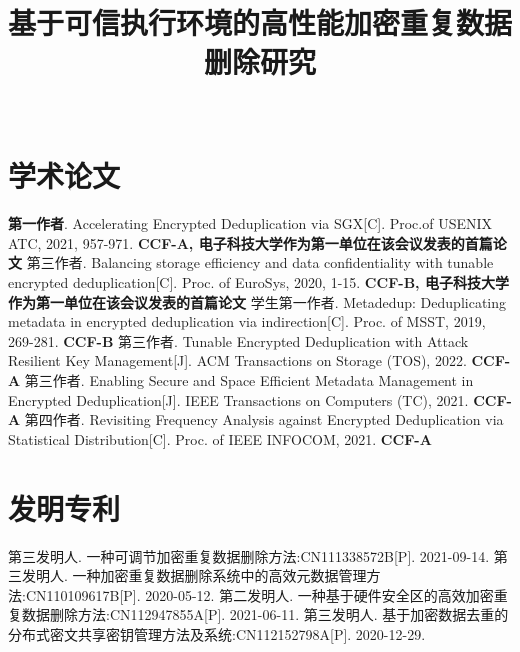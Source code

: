 \documentclass[master]{thesis-uestc}
\title{基于可信执行环境的高性能加密重复数据删除研究}{High-Performance Encrypted Data Deduplication System Based on Trusted Execution Environment}
\author{$\quad$}{$\quad$}
\begin{document}
\makecover
\originalitydeclaration



\thesistableofcontents
\thesisglossarylist







\thesisacknowledgement
% 


\thesisappendix


\begin{thesistheaccomplish}
    \section{学术论文}
     \textbf{第一作者}. Accelerating Encrypted Deduplication via SGX[C]. Proc.of USENIX ATC, 2021, 957-971. \textbf{CCF-A, 电子科技大学作为第一单位在该会议发表的首篇论文}
     第三作者. Balancing storage efficiency and data confidentiality with tunable encrypted deduplication[C]. Proc. of EuroSys, 2020, 1-15. \textbf{CCF-B, 电子科技大学作为第一单位在该会议发表的首篇论文}
     学生第一作者. Metadedup: Deduplicating metadata in encrypted deduplication via indirection[C]. Proc. of MSST, 2019, 269-281. \textbf{CCF-B}
     第三作者. Tunable Encrypted Deduplication with Attack Resilient Key Management[J]. ACM Transactions on Storage (TOS), 2022. \textbf{CCF-A}
     第三作者. Enabling Secure and Space Efficient Metadata Management in Encrypted Deduplication[J]. IEEE Transactions on Computers (TC), 2021. \textbf{CCF-A}
     第四作者. Revisiting Frequency Analysis against Encrypted Deduplication via Statistical Distribution[C]. Proc. of IEEE INFOCOM, 2021. \textbf{CCF-A}
    \section{发明专利}
     第三发明人. 一种可调节加密重复数据删除方法:CN111338572B[P]. 2021-09-14.
     第三发明人. 一种加密重复数据删除系统中的高效元数据管理方法:CN110109617B[P]. 2020-05-12.
     第二发明人. 一种基于硬件安全区的高效加密重复数据删除方法:CN112947855A[P]. 2021-06-11.
     第三发明人. 基于加密数据去重的分布式密文共享密钥管理方法及系统:CN112152798A[P]. 2020-12-29.
\end{thesistheaccomplish}
\end{document}
